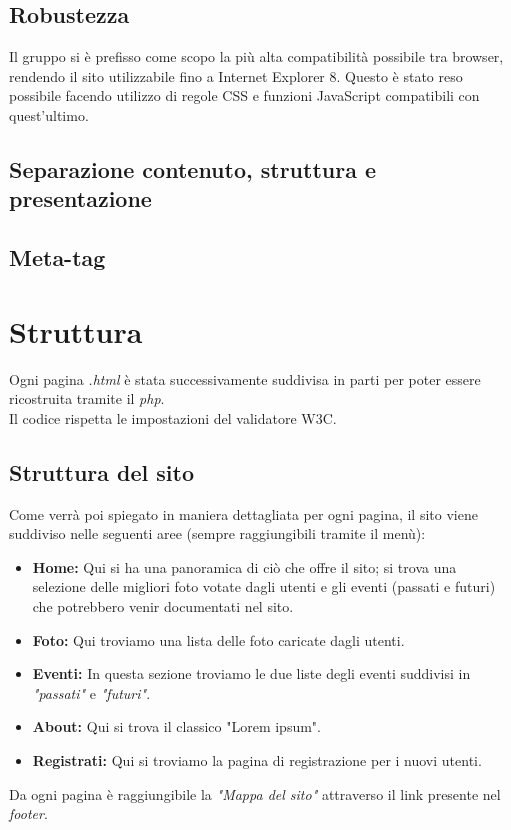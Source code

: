 	\subsection{Robustezza}
	Il gruppo si è prefisso come scopo la più alta compatibilità possibile tra browser, rendendo il sito utilizzabile fino a Internet Explorer 8. Questo è stato reso possibile facendo utilizzo di regole CSS e funzioni JavaScript compatibili con quest'ultimo.
	\subsection{Separazione contenuto, struttura e presentazione}
	\subsection{Meta-tag}
	\section{Struttura}
	Ogni pagina \textit{.html} è stata successivamente suddivisa in parti per poter essere ricostruita tramite il \textit{php}.\\ Il codice rispetta le impostazioni del validatore W3C.
	\subsection{Struttura del sito}
	Come verrà poi spiegato in maniera dettagliata per ogni pagina, il sito viene suddiviso nelle seguenti aree (sempre raggiungibili tramite il menù):
	\begin{itemize}
	\item \textbf{Home:} Qui si ha una panoramica di ciò che offre il sito; si trova una selezione delle migliori foto votate dagli utenti e gli eventi (passati e futuri) che potrebbero venir documentati nel sito.
	\item \textbf{Foto:} Qui troviamo una lista delle foto caricate dagli utenti.
	\item \textbf{Eventi:} In questa sezione troviamo le due liste degli eventi suddivisi in \textit{"passati"} e \textit{"futuri"}.
	\item \textbf{About:} Qui si trova il classico "Lorem ipsum".
	\item \textbf{Registrati:} Qui si troviamo la pagina di registrazione per i nuovi utenti.
	\end{itemize}
	Da ogni pagina è raggiungibile la \textit{"Mappa del sito"} attraverso il link presente nel \textit{footer}.
